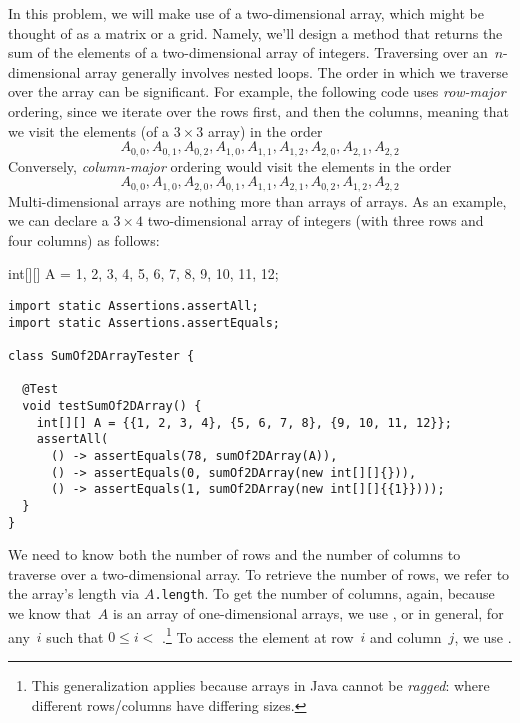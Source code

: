 In this problem, we will make use of a two-dimensional array, which might be thought of as a matrix or a grid. 
Namely, we'll design a method that returns the sum of the elements of a two-dimensional array of integers. 
Traversing over an~$n$-dimensional array generally involves nested loops. 
The order in which we traverse over the array can be significant. 
For example, the following code uses \emph{row-major} ordering, since we iterate over the rows first, and then the columns, meaning that we visit the elements (of a $3\times{3}$ array) in the order
\[
  A_{0,0}, A_{0,1}, A_{0,2}, A_{1,0}, A_{1,1}, A_{1,2}, A_{2,0}, A_{2,1}, A_{2,2}
\] 
Conversely, \emph{column-major} ordering would visit the elements in the order
\[
  A_{0,0}, A_{1,0}, A_{2,0}, A_{0,1}, A_{1,1}, A_{2,1}, A_{0,2}, A_{1,2}, A_{2,2}
\]
Multi-dimensional arrays are nothing more than arrays of arrays. 
As an example, we can declare a $3 \times 4$ two-dimensional array of integers (with three rows and four columns) as follows:

\begin{verbnobox}[\small]
int[][] A = {{1, 2, 3, 4}, {5, 6, 7, 8}, {9, 10, 11, 12}};
\end{verbnobox}

\begin{lstlisting}[language=MyJava]
import static Assertions.assertAll;
import static Assertions.assertEquals;

class SumOf2DArrayTester {

  @Test
  void testSumOf2DArray() {
    int[][] A = {{1, 2, 3, 4}, {5, 6, 7, 8}, {9, 10, 11, 12}};
    assertAll(
      () -> assertEquals(78, sumOf2DArray(A)),
      () -> assertEquals(0, sumOf2DArray(new int[][]{})),
      () -> assertEquals(1, sumOf2DArray(new int[][]{{1}})));
  }
}
\end{lstlisting}

We need to know both the number of rows and the number of columns to traverse over a two-dimensional array. 
To retrieve the number of rows, we refer to the array's length via \texttt{$A$.length}. 
To get the number of columns, again, because we know that~$A$ is an array of one-dimensional arrays, we use , or in general,  for any~$i$ such that $0 \leq i< $ .\footnote{This generalization applies because arrays in Java cannot be \emph{ragged}: where different rows/columns have differing sizes.} To access the element at row~$i$ and column~$j$, we use . 

